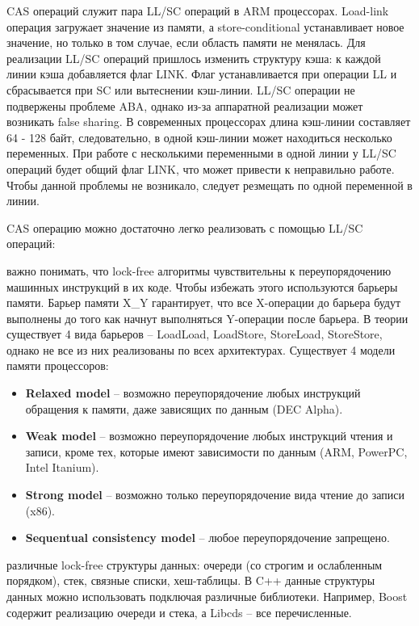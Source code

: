 {	 CAS операций служит пара LL/SC операций в ARM процессорах. Load-link операция загружает значение из памяти, а store-conditional устанавливает новое значение, но только в том случае, если область памяти не менялась. Для реализации LL/SC операций пришлось изменить структуру кэша: к каждой линии кэша добавляется флаг LINK. Флаг устанавливается при операции LL и сбрасывается при SC или вытеснении кэш-линии. LL/SC операции не подвержены проблеме ABA, однако из-за аппаратной реализации может возникать false sharing. В современных процессорах длина кэш-линии составляет 64 - 128 байт, следовательно, в одной кэш-линии может находиться несколько переменных. При работе с несколькими переменными в одной линии у LL/SC операций будет общий флаг LINK, что может привести к неправильно работе. Чтобы данной проблемы не возникало, следует резмещать по одной переменной в линии.
	\begin{figure}[H]
		
	\end{figure}
	\par CAS операцию можно достаточно легко реализовать с помощью LL/SC операций:
	\begin{figure}[H]
		
	\end{figure}
	 важно понимать, что lock-free алгоритмы чувствительны к переупорядочению машинных инструкций в их коде. Чтобы избежать этого используются барьеры памяти. Барьер памяти X\_Y гарантирует, что все X-операции до барьера будут выполнены до того как начнут выполняться Y-операции после барьера. В теории существует 4 вида барьеров -- LoadLoad, LoadStore, StoreLoad, StoreStore, однако не все из них реализованы по всех архитектурах. Существует 4 модели памяти процессоров: 
	\begin{itemize}  
		\item\textbf{Relaxed model} -- возможно переупорядочение любых инструкций обращения к памяти, даже зависящих по данным (DEC Alpha).
		\item\textbf{Weak model} -- возможно переупорядочение любых инструкций чтения и записи, кроме тех, которые имеют зависимости по данным (ARM, PowerPC, Intel Itanium).
		\item\textbf{Strong model } -- возможно только переупорядочение вида чтение до записи (x86).
		\item\textbf{Sequentual consistency model} -- любое переупорядочение запрещено.
	\end{itemize}
	 различные lock-free структуры данных: очереди (со строгим и ослабленным порядком), стек, связные списки, хеш-таблицы. В C++ данные структуры данных можно использовать подключая различные библиотеки. Например, Boost содержит реализацию очереди и стека, а Libcds -- все перечисленные.
}
